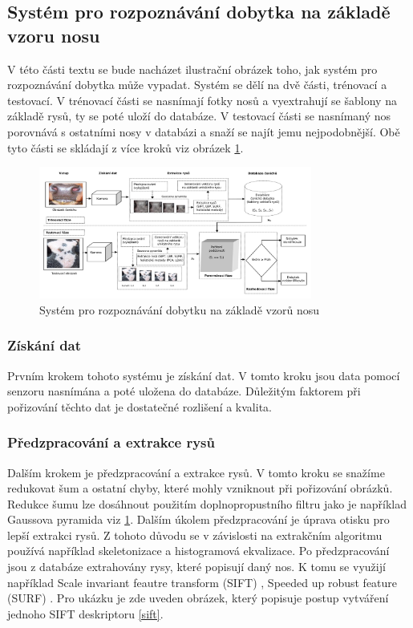 \subsection{Systém pro rozpoznávání dobytka na základě vzoru nosu}
V této části textu se bude nacházet ilustrační obrázek toho, jak systém pro rozpoznávání dobytka může vypadat. Systém se dělí na dvě části, trénovací a testovací. V trénovací části se nasnímají fotky nosů a vyextrahují se šablony na základě rysů, ty se poté uloží do databáze. V testovací části se nasnímaný nos porovnává s ostatními nosy v databázi a snaží se najít jemu nejpodobnější. Obě tyto části se skládají z více kroků viz obrázek \ref{system_cattle}.

\newpage
\begin{figure}[h]
	\centering
	\includegraphics[width=0.8\textwidth]{obrazky/cattle_system (1).png}
	\caption{Systém pro rozpoznávání dobytku na základě vzorů nosu \cite{cattle_recognition_paper}}
	\label{system_cattle}
\end{figure}

\subsubsection{Získání dat}
Prvním krokem tohoto systému je získání dat. V tomto kroku jsou data pomocí senzoru nasnímána a poté uložena do databáze. Důležitým faktorem při pořizování těchto dat je dostatečné rozlišení a kvalita. 

\subsubsection{Předzpracování a extrakce rysů}
Dalším krokem je předzpracování a extrakce rysů. V tomto kroku se snažíme redukovat šum a ostatní chyby, které mohly vzniknout při pořizování obrázků. Redukce šumu lze dosáhnout použitím doplnopropustního filtru jako je například Gaussova pyramida viz \ref{system_cattle}. Dalším úkolem předzpracování je úprava otisku pro lepší extrakci rysů. Z tohoto důvodu se v závislosti na extrakčním algoritmu používá například skeletonizace a histogramová ekvalizace. Po předzpracování jsou z databáze extrahovány rysy, které popisují daný nos. K tomu se využijí například Scale invariant feautre transform (SIFT) \cite{6644052, NOVIYANTO201377} , Speeded up robust feature (SURF) \cite{noviyanto2012automatic}. Pro ukázku je zde uveden obrázek, který popisuje postup vytváření jednoho SIFT deskriptoru \ref{sift}.



